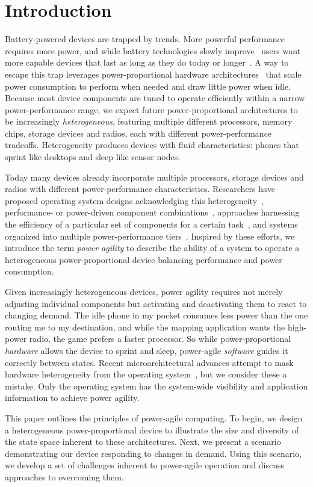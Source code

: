 \section{Introduction}

Battery-powered devices are trapped by trends. More powerful performance
requires more power, and while battery technologies slowly
improve~\cite{economist-batteryhistory} users want more capable devices that
last as long as they do today or longer~\cite{informationweek-batteries}. A
way to escape this trap leverages power-proportional hardware
architectures~\cite{barroso-energyproportional} that scale power consumption
to perform when needed and draw little power when idle. Because most device
components are tuned to operate efficiently within a narrow power-performance
range, we expect future power-proportional architectures to be increasingly
\textit{heterogeneous}, featuring multiple different processors, memory
chips, storage devices and radios, each with different power-performance
tradeoffs. Heterogeneity produces devices with fluid characteristics: phones
that sprint like desktops and sleep like sensor nodes.

Today many devices already incorporate multiple processors, storage devices
and radios with different power-performance characteristics. Researchers have
proposed operating system designs acknowledging this
heterogeneity~\cite{baumann-barrelfish}, performance- or power-driven
component combinations~\cite{mogul-hybridnvmdram,aruna-3Gwifi}, approaches
harnessing the efficiency of a particular set of components for a certain
task~\cite{andersen-fawn,szalay-amdahl}, and systems organized into multiple
power-performance tiers~\cite{sorber-turducken}. Inspired by these efforts,
we introduce the term \textit{power agility} to describe the ability of a
system to operate a heterogeneous power-proportional device balancing
performance and power consumption.

Given increasingly heterogeneous devices, power agility requires not merely
adjusting individual components but activating and deactivating them to react
to changing demand. The idle phone in my pocket consumes less power than the
one routing me to my destination, and while the mapping application wants the
high-power radio, the game prefers a faster processor. So while
power-proportional \textit{hardware} allows the device to sprint and sleep,
power-agile \textit{software} guides it correctly between states. Recent
microarchitectural advances attempt to mask hardware heterogeneity from the
operating system~\cite{rangan-hpca11}, but we consider these a mistake. Only
the operating system has the system-wide visibility and application
information to achieve power agility.

This paper outlines the principles of power-agile computing. To begin, we
design a heterogeneous power-proportional device to illustrate the size and
diversity of the state space inherent to these architectures. Next, we
present a scenario demonstrating our device responding to changes in demand.
Using this scenario, we develop a set of challenges inherent to power-agile
operation and discuss approaches to overcoming them.
